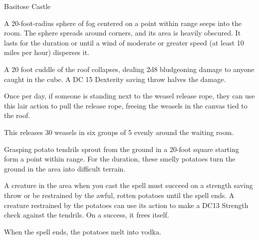 \begin{monsterbox}{Basitose Castle}

\begin{monsteraction}
A 20-foot-radius sphere of fog centered on a point within range seeps into the room. The sphere spreads around corners, and its area is heavily obscured. It lasts for the duration or until a wind of moderate or greater speed (at least 10 miles per hour) disperses it.
\end{monsteraction}

\begin{monsteraction}
A 20 foot cuddle of the roof collapses, dealing 2d8 bludgeoning damage to anyone caught in the cube. A DC 15 Dexterity saving throw halves the damage.
\end{monsteraction}

\begin{monsteraction}
Once per day, if someone is standing next to the weasel release rope, they can use this lair action to pull the release rope, freeing the weasels in the canvas tied to the roof. 

This releases 30 weasels in six groups of 5 evenly around the waiting room.
\end{monsteraction}
\begin{monsteraction}
Grasping potato tendrils sprout from the ground in a 20-foot square starting form a point within range. For the duration, these smelly potatoes turn the ground in the area into difficult terrain.

A creature in the area when you cast the spell must succeed on a strength saving throw or be restrained by the awful, rotten potatoes until the spell ends. A creature restrained by the potatoes can use its action to make a DC13 Strength check against the tendrils. On a success, it frees itself.

When the spell ends, the potatoes melt into vodka.
\end{monsteraction}

\end{monsterbox}
